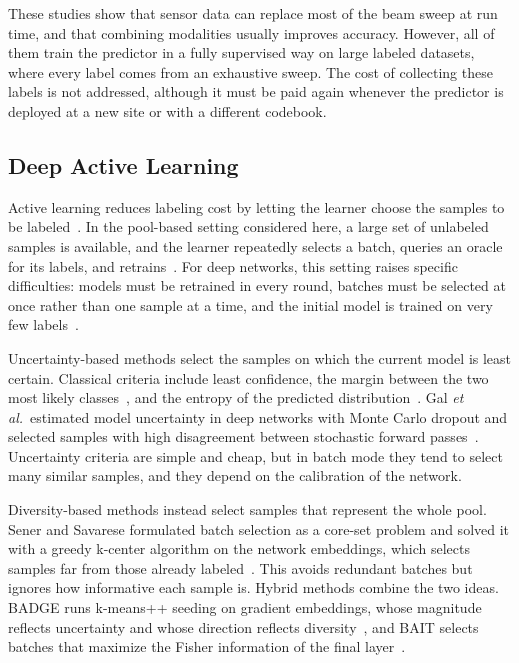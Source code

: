 \documentclass[journal,onecolumn]{IEEEtran}
\begin{document}
These studies show that sensor data can replace most of the beam sweep at run time, and that combining modalities usually improves accuracy. However, all of them train the predictor in a fully supervised way on large labeled datasets, where every label comes from an exhaustive sweep. The cost of collecting these labels is not addressed, although it must be paid again whenever the predictor is deployed at a new site or with a different codebook.

\subsection{Deep Active Learning}
Active learning reduces labeling cost by letting the learner choose the samples to be labeled~\cite{settles2009survey}. In the pool-based setting considered here, a large set of unlabeled samples is available, and the learner repeatedly selects a batch, queries an oracle for its labels, and retrains~\cite{settles2009survey,ren2021survey}. For deep networks, this setting raises specific difficulties: models must be retrained in every round, batches must be selected at once rather than one sample at a time, and the initial model is trained on very few labels~\cite{ren2021survey}.

Uncertainty-based methods select the samples on which the current model is least certain. Classical criteria include least confidence, the margin between the two most likely classes~\cite{scheffer2001active}, and the entropy of the predicted distribution~\cite{settles2009survey}. Gal \emph{et al.}\ estimated model uncertainty in deep networks with Monte Carlo dropout and selected samples with high disagreement between stochastic forward passes~\cite{gal2017deep}. Uncertainty criteria are simple and cheap, but in batch mode they tend to select many similar samples, and they depend on the calibration of the network.

Diversity-based methods instead select samples that represent the whole pool. Sener and Savarese formulated batch selection as a core-set problem and solved it with a greedy k-center algorithm on the network embeddings, which selects samples far from those already labeled~\cite{sener2018coreset}. This avoids redundant batches but ignores how informative each sample is. Hybrid methods combine the two ideas. BADGE runs k-means++ seeding on gradient embeddings, whose magnitude reflects uncertainty and whose direction reflects diversity~\cite{ash2020badge}, and BAIT selects batches that maximize the Fisher information of the final layer~\cite{ash2021bait}.
\end{document}
